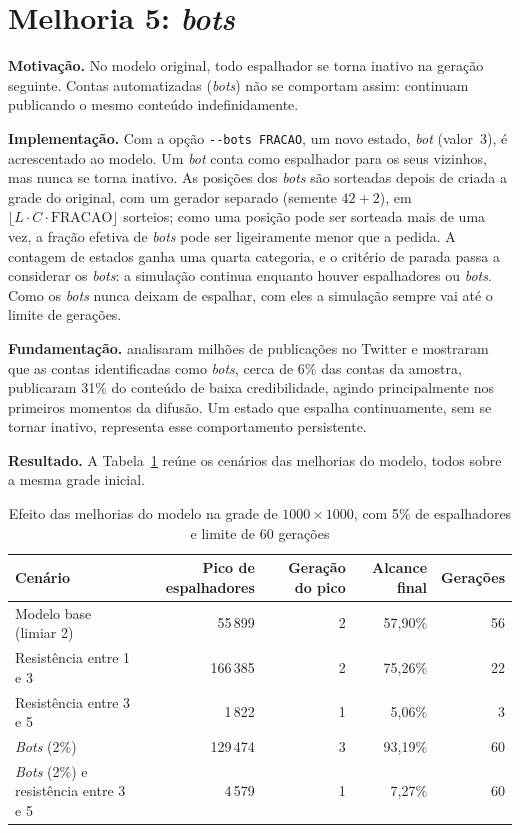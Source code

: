 \section{Melhoria 5: \textit{bots}}\label{sec:melhoria-bots}

\textbf{Motivação.} No modelo original, todo espalhador se torna inativo na geração seguinte. Contas automatizadas (\textit{bots}) não se comportam assim: continuam publicando o mesmo conteúdo indefinidamente.

\textbf{Implementação.} Com a opção \texttt{-{}-bots FRACAO}, um novo estado, \textit{bot} (valor~3), é acrescentado ao modelo. Um \textit{bot} conta como espalhador para os seus vizinhos, mas nunca se torna inativo. As posições dos \textit{bots} são sorteadas depois de criada a grade do original, com um gerador separado (semente $42 + 2$), em $\lfloor L \cdot C \cdot \textrm{FRACAO} \rfloor$ sorteios; como uma posição pode ser sorteada mais de uma vez, a fração efetiva de \textit{bots} pode ser ligeiramente menor que a pedida. A contagem de estados ganha uma quarta categoria, e o critério de parada passa a considerar os \textit{bots}: a simulação continua enquanto houver espalhadores ou \textit{bots}. Como os \textit{bots} nunca deixam de espalhar, com eles a simulação sempre vai até o limite de gerações.

\textbf{Fundamentação.}  analisaram milhões de publicações no Twitter e mostraram que as contas identificadas como \textit{bots}, cerca de 6\% das contas da amostra, publicaram 31\% do conteúdo de baixa credibilidade, agindo principalmente nos primeiros momentos da difusão. Um estado que espalha continuamente, sem se tornar inativo, representa esse comportamento persistente.

\textbf{Resultado.} A Tabela~\ref{tab:melhoria-modelo} reúne os cenários das melhorias do modelo, todos sobre a mesma grade inicial.

\begin{table}[htb]
    \centering
    \caption{Efeito das melhorias do modelo na grade de $1000 \times 1000$, com 5\% de espalhadores e limite de 60 gerações}
    \label{tab:melhoria-modelo}
    \begin{tabular}{lrrrr}
        \toprule
        \textbf{Cenário} & \textbf{Pico de espalhadores} & \textbf{Geração do pico} & \textbf{Alcance final} & \textbf{Gerações} \\
        \midrule
        Modelo base (limiar 2)              & 55\,899  & 2 & 57,90\% & 56 \\
        Resistência entre 1 e 3             & 166\,385 & 2 & 75,26\% & 22 \\
        Resistência entre 3 e 5             & 1\,822   & 1 & 5,06\%  & 3  \\
        \textit{Bots} (2\%)                 & 129\,474 & 3 & 93,19\% & 60 \\
        \textit{Bots} (2\%) e resistência entre 3 e 5 & 4\,579 & 1 & 7,27\% & 60 \\
        \bottomrule
    \end{tabular}
    \fonte{}
\end{table}

